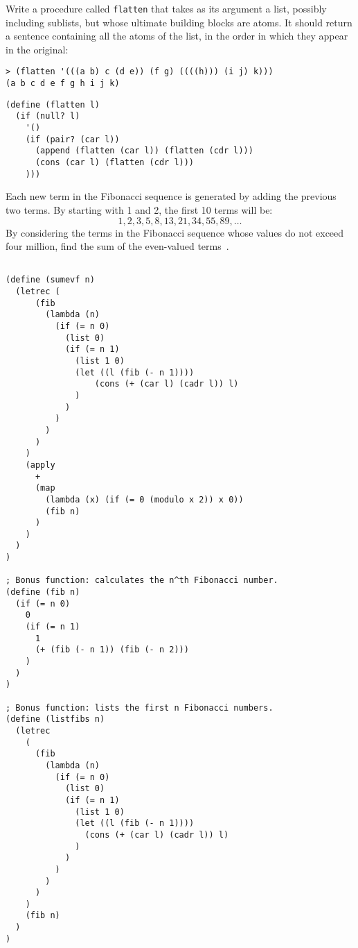 \begin{questions}
\question
Write a procedure called \texttt{flatten} that takes as its argument a list, possibly including sublists, but whose ultimate building blocks are atoms.
It should return a sentence containing all the atoms of the list, in the order in which they appear in the original:
\begin{verbatim}
> (flatten '(((a b) c (d e)) (f g) ((((h))) (i j) k)))
(a b c d e f g h i j k)
\end{verbatim}

\begin{solution}
  \begin{verbatim}
(define (flatten l)
  (if (null? l)
    '()
    (if (pair? (car l))
      (append (flatten (car l)) (flatten (cdr l)))
      (cons (car l) (flatten (cdr l)))
    )))
  \end{verbatim}
\end{solution}

\question
Each new term in the Fibonacci sequence is generated by adding the previous two terms.
By starting with 1 and 2, the first 10 terms will be:
\[ 1, 2, 3, 5, 8, 13, 21, 34, 55, 89, \ldots \]
By considering the terms in the Fibonacci sequence whose values do not exceed four million, find the sum of the even-valued terms~\cite{projecteuler}.

\begin{solution}
  \begin{verbatim}
 
(define (sumevf n)
  (letrec (
      (fib
        (lambda (n)
          (if (= n 0)
            (list 0)
            (if (= n 1)
              (list 1 0)
              (let ((l (fib (- n 1))))
    	          (cons (+ (car l) (cadr l)) l)
              )
            )
          )
        )
      )
    )
    (apply
      +
      (map
        (lambda (x) (if (= 0 (modulo x 2)) x 0))
        (fib n)
      )
    )
  )
)

; Bonus function: calculates the n^th Fibonacci number. 
(define (fib n)
  (if (= n 0)
    0
    (if (= n 1)
      1
      (+ (fib (- n 1)) (fib (- n 2)))
    )
  )
)

; Bonus function: lists the first n Fibonacci numbers.
(define (listfibs n)
  (letrec
    (
      (fib
        (lambda (n)
          (if (= n 0)
            (list 0)
            (if (= n 1)
              (list 1 0)
              (let ((l (fib (- n 1))))
                (cons (+ (car l) (cadr l)) l)
              )
            )
          )
        )
      )
    )
    (fib n)
  )
)


\end{verbatim}
\end{solution}
\end{questions}
